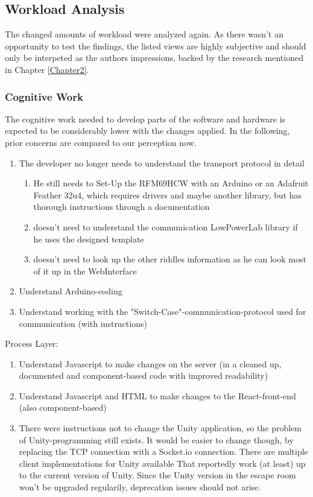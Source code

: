 \subsection{Workload Analysis}
The changed amounts of workload were analyzed again. 
As there wasn't an opportunity to test the findings, the listed views are highly subjective 
and should only be interpeted as the authors impressions, backed by the research mentioned in Chapter \ref{Chapter2}.
\subsubsection{Cognitive Work}
The cognitive work needed to develop parts 
of the software and hardware is expected to be considerably lower with the changes applied.
In the following, prior concerns are compared to our perception now.
\begin{enumerate}
    \item The developer no longer needs to understand the transport protocol in detail
    \begin{enumerate}
        \item 
        He still needs to Set-Up the RFM69HCW with an Arduino or an Adafruit Feather 32u4, 
        which requires drivers and maybe another library, but has thorough instructions through a documentation
        \item doesn't need to understand the communication LowPowerLab library if he uses the designed template
        \item doesn't need to look up the other riddles information as he can look most of it up in the WebInterface
    \end{enumerate}   
    \item Understand Arduino-coding 
    \item Understand working with the "Switch-Case"-communication-protocol used for communication (with instructions)
\end{enumerate}  
Process Layer:
\begin{enumerate}
    \item Understand Javascript to make changes on the server (in a cleaned up, documented and component-based code with improved readability)
    \item Understand Javascript and HTML to make changes to the React-front-end (also component-based) 
    \item     
    There were instructions not to change the Unity application, so the problem of Unity-programming still exists. 
    It would be easier to change though, by replacing the TCP connection with a Socket.io connection. 
    There are multiple client implementations for Unity available \parencite{socketioUnity1, socketioUnity2,socketioUnity3}
    That reportedly work (at least) up to the current version of Unity. 
    Since the Unity version in the escape room won't be upgraded regularily, deprecation issues should not arise.
\end{enumerate}  
